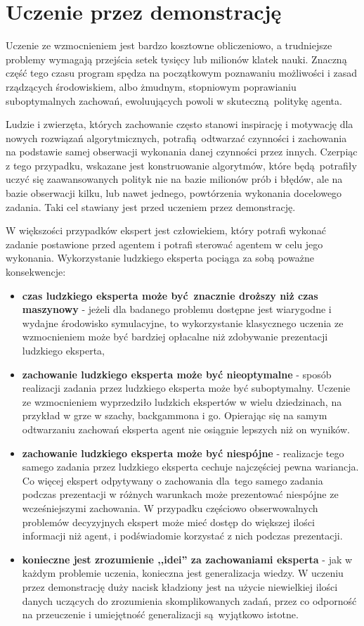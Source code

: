\section{Uczenie przez demonstrację}\label{imitation_learning}
Uczenie ze wzmocnieniem jest bardzo kosztowne obliczeniowo, a trudniejsze problemy wymagają przejścia setek tysięcy lub milionów klatek nauki. Znaczną część tego czasu program spędza na początkowym poznawaniu możliwości i zasad rządzących środowiskiem, albo żmudnym, stopniowym poprawianiu suboptymalnych zachowań, ewoluujących powoli w skuteczną politykę agenta.

Ludzie i zwierzęta, których zachowanie często stanowi inspirację i motywację dla nowych rozwiązań algorytmicznych, potrafią odtwarzać czynności i zachowania na podstawie samej obserwacji wykonania danej czynności przez innych. Czerpiąc z tego przypadku, wskazane jest konstruowanie algorytmów, które będą potrafiły uczyć się zaawansowanych polityk nie na bazie milionów prób i błędów, ale na bazie obserwacji kilku, lub nawet jednego, powtórzenia wykonania docelowego zadania. Taki cel stawiany jest przed uczeniem przez demonstrację.

W większości przypadków ekspert jest człowiekiem, który potrafi wykonać zadanie postawione przed agentem i potrafi sterować agentem w celu jego wykonania. Wykorzystanie ludzkiego eksperta pociąga za sobą poważne konsekwencje:
\begin{itemize}
\item \textbf{czas ludzkiego eksperta może być znacznie droższy niż czas maszynowy} - jeżeli dla badanego problemu dostępne jest wiarygodne i wydajne środowisko symulacyjne, to wykorzystanie klasycznego uczenia ze wzmocnieniem może być bardziej opłacalne niż zdobywanie prezentacji ludzkiego eksperta,
\item \textbf{zachowanie ludzkiego eksperta może być nieoptymalne} - sposób realizacji zadania przez ludzkiego eksperta może być suboptymalny. Uczenie ze wzmocnieniem wyprzedziło ludzkich ekspertów w wielu dziedzinach, na przykład w grze w szachy, backgammona i go. Opierając się na samym odtwarzaniu zachowań eksperta agent nie osiągnie lepszych niż on wyników.
\item \textbf{zachowanie ludzkiego eksperta może być niespójne} - realizacje tego samego zadania przez ludzkiego eksperta cechuje najczęściej pewna wariancja. Co więcej ekspert odpytywany o zachowania dla tego samego zadania podczas prezentacji w różnych warunkach może prezentować niespójne ze wcześniejszymi zachowania. W przypadku częściowo obserwowalnych problemów decyzyjnych ekspert może mieć dostęp do większej ilości informacji niż agent, i podświadomie korzystać z nich podczas prezentacji.
\item  \textbf{konieczne jest zrozumienie ,,idei'' za zachowaniami eksperta} - jak w każdym problemie uczenia, konieczna jest generalizacja wiedzy. W uczeniu przez demonstrację duży nacisk kładziony jest na użycie niewielkiej ilości danych uczących do zrozumienia skomplikowanych zadań, przez co odporność na przeuczenie i umiejętność generalizacji są wyjątkowo istotne.
\end{itemize}   


